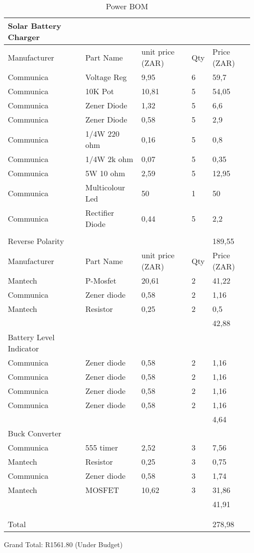 \documentclass[class=report,11pt,crop=false]{standalone}
\begin{document}
\begin{table}
\centering

\begin{tabular}{|l |l |l |l |l|} \hline 
Solar Battery Charger &  &  &  &  \\ \hline 
Manufacturer & Part Name & unit price (ZAR) & Qty & Price (ZAR) \\ \hline 
Communica & Voltage Reg & 9,95 & 6 & 59,7 \\ \hline 
Communica & 10K Pot & 10,81 & 5 & 54,05 \\ \hline 
Communica & Zener Diode & 1,32 & 5 & 6,6 \\ \hline 
Communica & Zener Diode & 0,58 & 5 & 2,9 \\ \hline 
Communica & 1/4W 220 ohm & 0,16 & 5 & 0,8 \\ \hline 
Communica & 1/4W 2k ohm & 0,07 & 5 & 0,35 \\ \hline 
Communica & 5W 10 ohm & 2,59 & 5 & 12,95 \\ \hline 
Communica & Multicolour Led & 50 & 1 & 50 \\ \hline 
Communica & Rectifier Diode & 0,44 & 5 & 2,2 \\ \hline 
 &  &  &  &  \\ \hline 
Reverse Polarity &  &  &  & 189,55 \\ \hline 
Manufacturer & Part Name & unit price (ZAR) & Qty & Price (ZAR) \\ \hline 
Mantech & P-Mosfet & 20,61 & 2 & 41,22 \\ \hline 
Communica & Zener diode & 0,58 & 2 & 1,16 \\ \hline 
Mantech & Resistor & 0,25 & 2 & 0,5 \\ \hline 
 &  &  &  & 42,88 \\ \hline 
Battery Level Indicator &  &  &  &  \\ \hline 
Communica & Zener diode & 0,58 & 2 & 1,16 \\ \hline 
Communica & Zener diode & 0,58 & 2 & 1,16 \\ \hline 
Communica & Zener diode & 0,58 & 2 & 1,16 \\ \hline 
Communica & Zener diode & 0,58 & 2 & 1,16 \\ \hline 
 &  &  &  & 4,64 \\ \hline 
Buck Converter &  &  &  &  \\ \hline 
Communica & 555 timer & 2,52 & 3 & 7,56 \\ \hline 
Mantech & Resistor & 0,25 & 3 & 0,75 \\ \hline 
Communica & Zener diode & 0,58 & 3 & 1,74 \\ \hline 
Mantech & MOSFET & 10,62 & 3 & 31,86 \\ \hline 
 &  &  &  & 41,91 \\ \hline 
 &  &  &  &  \\ \hline 
 &  &  &  &  \\ \hline 
Total &  &  &  & 278,98 \\ \hline

\end{tabular}
\caption{Power BOM}
\label{tab:my_table}
\end{table}

Grand Total: R1561.80 (Under Budget)

\ifstandalone

\printnoidxglossary[type=\acronymtype,nonumberlist]
\fi
\end{document}
